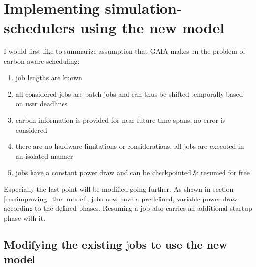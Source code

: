 % 

\section{Implementing simulation-schedulers using the new model}

I would first like to summarize assumption that GAIA makes on the problem of carbon aware scheduling:

\begin{enumerate}
    \item job lengths are known
    \item all considered jobs are batch jobs and can thus be shifted temporally based on user deadlines
    \item carbon information is provided for near future time spans, no error is considered
    \item there are no hardware limitations or considerations, all jobs are executed in an isolated manner
    \item jobs have a constant power draw and can be checkpointed \& resumed for free
\end{enumerate}

Especially the last point will be modified going further. As shown in section \ref{sec:improving_the_model}, jobs now have a predefined, variable power draw according to the defined phases. Resuming a job also carries an additional startup phase with it.

\subsection{Modifying the existing jobs to use the new model}

